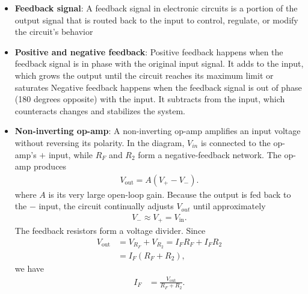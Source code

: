 \documentclass{report}
\begin{document}
\begin{itemize}
            \bigbreak \noindent 
            Two signals are \textbf{out of phase} (specifically 180 degrees out of phase) when the peak of one signal aligns perfectly with the trough of the other. One goes up exactly when the other goes down.
        \item \textbf{Feedback signal}: A feedback signal in electronic circuits is a portion of the output signal that is routed back to the input to control, regulate, or modify the circuit's behavior
        \item \textbf{Positive and negative feedback}: Positive feedback happens when the feedback signal is in phase with the original input signal. It adds to the input, which grows the output until the circuit reaches its maximum limit or saturates
            \bigbreak \noindent 
            Negative feedback happens when the feedback signal is out of phase (180 degrees opposite) with the input. It subtracts from the input, which counteracts changes and stabilizes the system.
        \item \textbf{Non-inverting op-amp}: A non-inverting op-amp amplifies an input voltage without reversing its polarity.
            \bigbreak \noindent 
            \bigbreak \noindent 
            In the diagram, \(V_{in}\) is connected to the op-amp’s \(+\) input, while \(R_F\) and \(R_2\) form a negative-feedback network.
            \bigbreak \noindent 
            The op-amp produces
            \begin{align*}
                V_{\text{out}} = A(V_{+} - V_{-})
            .\end{align*}
            where \(A\) is its very large open-loop gain. Because the output is fed back to the \(−\) input, the circuit continually adjusts \(V_{out}\) until approximately
            \begin{align*}
                V_{-} \approx V_{+} = V_{\text{in}}
            .\end{align*}
            The feedback resistors form a voltage divider. Since
            \begin{align*}
                V_{\text{out}} &= V_{R_{F}} + V_{R_{2}} = I_{F}R_{F} + I_{F}R_{2} \\
                &= I_{F}(R_{F} + R_{2})
            ,\end{align*}
            we have
            \begin{align*}
                I_{F} &= \frac{V_{\text{out}}}{R_{F} + R_{2}}
            .\end{align*}

\end{itemize}
\end{document}

